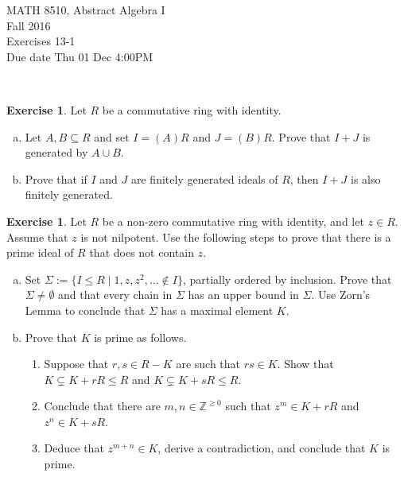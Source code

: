 \documentclass{amsart}
\newcommand{\bbz}{\mathbb{Z}}
\theoremstyle{plain}
\theoremstyle{definition}
\newtheorem{exer}[lem]{Exercise}
\begin{document}
\noindent MATH 8510, Abstract Algebra I \\
Fall 2016\\
Exercises 13-1\\
Due date Thu 01 Dec 4:00PM

\



\begin{exer}
Let $R$ be a commutative ring with identity.
\begin{enumerate}[(a)]
\item 
Let $A,B\subseteq R$ and set $I=(A)R$ and $J=(B)R$. 
Prove that $I+J$ is generated by $A\cup B$.
\item 
Prove that if $I$ and $J$ are finitely generated ideals of $R$, then $I+J$ is also finitely generated.
\end{enumerate}
\end{exer}

\begin{exer}
Let $R$ be a non-zero commutative ring with identity, and let $z\in R$.
Assume that $z$ is not nilpotent.
Use the following steps to prove that there is a prime ideal of $R$ that does not contain $z$.
\begin{enumerate}[(a)]
\item Set $\Sigma:=\{I\leq R\mid 1,z,z^2,\ldots\notin I\}$, partially ordered by inclusion. Prove that $\Sigma\neq\emptyset$ and that every chain in $\Sigma$ has an upper bound in $\Sigma$.
Use Zorn's Lemma to conclude that $\Sigma$ has a maximal element $K$.
\item Prove that $K$ is prime as follows.
\begin{enumerate}[(1)]
\item 
Suppose that $r,s\in R-K$ are such that $rs\in K$. Show that $K\subsetneq K+rR\leq R$
and $K\subsetneq K+sR\leq R$.
\item Conclude that there are $m,n\in\bbz^{\geq 0}$ such that $z^m\in K+rR$ and $z^n\in K+sR$.
\item Deduce that $z^{m+n}\in K$,  derive a contradiction, and conclude that $K$ is prime.
\end{enumerate}
\end{enumerate}
\end{exer}
\end{document}
